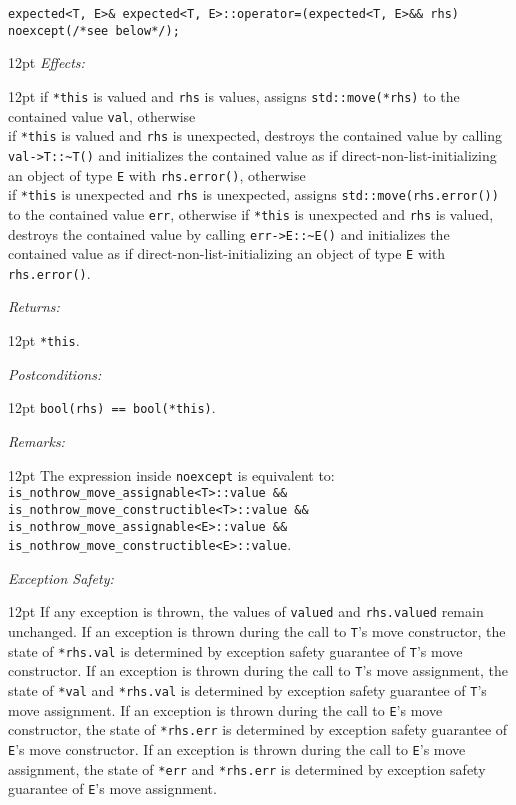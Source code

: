 \documentclass[a4paper,10pt]{article}
\newcommand{\cpp}[1]{\lstinline{#1}}
\newcommand{\wordingItem}[1]{\noindent\textit{#1:}}
\newenvironment{wordingTextItem}[1]{\wordingItem{#1}\vspace{7pt}\noindent\begin{adjustwidth}{12pt}{}}{\vspace{7pt}\end{adjustwidth}}
\newenvironment{wordingPara}{\begin{adjustwidth}{12pt}{}}{\end{adjustwidth}}
\begin{document}
\begin{lstlisting}[xleftmargin=0pt]
expected<T, E>& expected<T, E>::operator=(expected<T, E>&& rhs) noexcept(/*see below*/); 
\end{lstlisting}
\begin{wordingPara}
\begin{wordingTextItem}{Effects}
if \cpp{*this} is valued and \cpp{rhs} is values, assigns \cpp{std::move(*rhs)} to the contained value \cpp{val}, otherwise \\
if \cpp{*this} is valued and \cpp{rhs} is unexpected, destroys the contained value by calling \cpp{val->T::~T()} and  initializes the contained value as if direct-non-list-initializing an object of type \cpp{E} with \cpp{rhs.error()}, otherwise \\
if \cpp{*this} is unexpected and \cpp{rhs} is unexpected, assigns \cpp{std::move(rhs.error())} to the contained value \cpp{err}, otherwise  
if \cpp{*this} is unexpected and \cpp{rhs} is valued, destroys the contained value by calling \cpp{err->E::~E()} and  initializes the contained value as if direct-non-list-initializing an object of type \cpp{E} with \cpp{rhs.error()}.
\end{wordingTextItem}
\begin{wordingTextItem}{Returns}
\cpp{*this}.
\end{wordingTextItem}
\begin{wordingTextItem}{Postconditions}
\cpp{bool(rhs) == bool(*this)}.
\end{wordingTextItem}
\begin{wordingTextItem}{Remarks}
The expression inside \cpp{noexcept} is equivalent to:\\
\cpp{is_nothrow_move_assignable<T>::value &&}\\
\cpp{is_nothrow_move_constructible<T>::value &&}\\
\cpp{is_nothrow_move_assignable<E>::value &&}\\
\cpp{is_nothrow_move_constructible<E>::value}.
\end{wordingTextItem}
\begin{wordingTextItem}{Exception Safety}
If any exception is thrown, the values of \cpp{valued} and \cpp{rhs.valued} remain unchanged. If an exception is thrown during the call to \cpp{T}'s move constructor, the state of \cpp{*rhs.val} is determined by exception safety guarantee of \cpp{T}'s move constructor. If an exception is thrown during the call to \cpp{T}'s move assignment, the state of \cpp{*val} and \cpp{*rhs.val} is determined by exception safety guarantee of \cpp{T}'s move assignment. If an exception is thrown during the call to \cpp{E}'s move constructor, the state of \cpp{*rhs.err} is determined by exception safety guarantee of \cpp{E}'s move constructor. If an exception is thrown during the call to \cpp{E}'s move assignment, the state of \cpp{*err} and \cpp{*rhs.err} is determined by exception safety guarantee of \cpp{E}'s move assignment.

\end{wordingTextItem}
\end{wordingPara}
\end{document}
